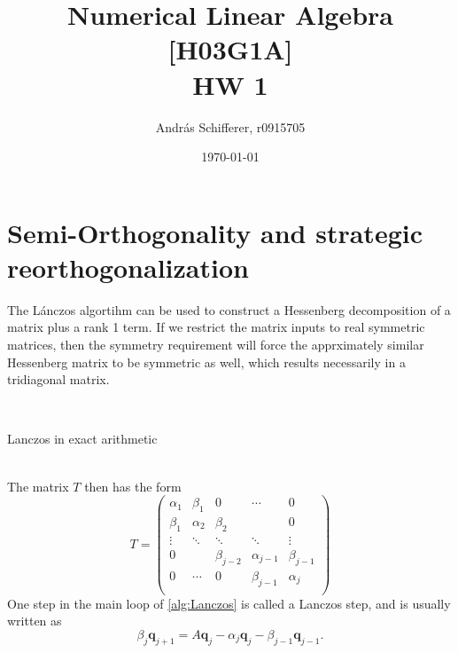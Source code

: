 \documentclass{article}
\author{Andr\'as Schifferer, r0915705}
\title{Numerical Linear Algebra [H03G1A]\\{\LARGE HW 1}}
\date{\today}
\begin{document}
	\maketitle
	\tableofcontents
	\section{Semi-Orthogonality and strategic reorthogonalization}
	The Lánczos algortihm can be used to construct a Hessenberg decomposition of a matrix plus a rank 1 term. If we restrict the matrix inputs to real symmetric matrices, then the symmetry requirement will force the apprximately similar Hessenberg matrix to be symmetric as well, which results necessarily in a tridiagonal matrix.
	\begin{algorithm2e}[ht]
		\label{alg:Lanczos}
		\SetAlgoLined
		\\
		\caption{Lanczos in exact arithmetic}
	\end{algorithm2e}\\
	
	The matrix $T$ then has the form 
	$$T=\begin{pmatrix}
		\alpha_1&\beta_1&0&\cdots&0\\
		\beta_1&\alpha_2&\beta_2&&0\\
		\vdots&\ddots&\ddots&\ddots&\vdots\\
		0&&\beta_{j-2}&\alpha_{j-1}&\beta_{j-1}\\
		0&\cdots&0&\beta_{j-1}&\alpha_{j}\\
	\end{pmatrix}$$
	One step in the main loop of \autoref{alg:Lanczos} is called a Lanczos step, and is usually written as
	\begin{equation}\label{eq:LanczosStep}
		\beta_j\mathbf{q}_{j+1}=A\mathbf{q}_j-\alpha_j\mathbf{q}_j-\beta_{j-1}\mathbf{q}_{j-1}.
	\end{equation}
	
\end{document}
